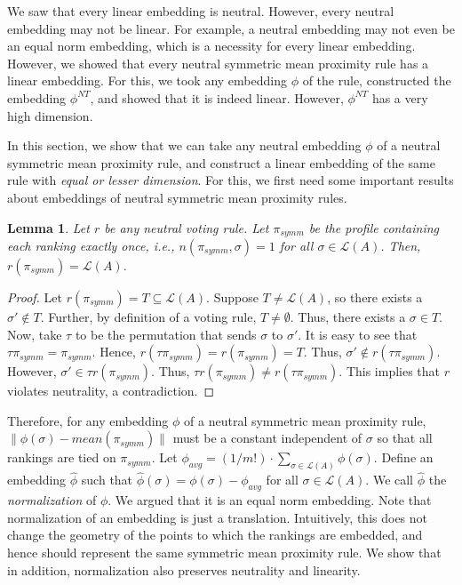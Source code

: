 \documentclass[10pt,letterpaper]{article}
\newcommand{\calL}{{\mathcal{L}}}
\newcommand{\rank}{{\calL(A)}}
\newtheorem{lemma}{Lemma}
\newcommand{\nt}{NT}
\begin{document}
We saw that every linear embedding is neutral. However, every neutral embedding may not be linear. For example, a neutral embedding may not even be an equal norm embedding, which is a necessity for every linear embedding. However, we showed that every neutral symmetric mean proximity rule has a linear embedding. For this, we took any embedding $\phi$ of the rule, constructed the embedding $\phi^{\nt}$, and showed that it is indeed linear. However, $\phi^{\nt}$ has a very high dimension. 

In this section, we show that we can take any neutral embedding $\phi$ of a neutral symmetric mean proximity rule, and construct a linear embedding of the same rule with \emph{equal or lesser dimension}. For this, we first need some important results about embeddings of neutral symmetric mean proximity rules.

\begin{lemma}
Let $r$ be any neutral voting rule. Let $\pi_{symm}$ be the profile containing each ranking exactly once, i.e., $n(\pi_{symm},\sigma) = 1$ for all $\sigma \in \rank$. Then, $r(\pi_{symm}) = \rank$. 
\label{lem:average-profile}
\end{lemma}
\begin{proof}
Let $r(\pi_{symm}) = T \subseteq \rank$. Suppose $T \neq \rank$, so there exists a $\sigma' \notin T$. Further, by definition of a voting rule, $T \neq \emptyset$. Thus, there exists a $\sigma \in T$. Now, take $\tau$ to be the permutation that sends $\sigma$ to $\sigma'$. %
It is easy to see that $\tau \pi_{symm} = \pi_{symm}$. Hence, $r(\tau \pi_{symm}) = r(\pi_{symm}) = T$. Thus, $\sigma' \notin r(\tau \pi_{symm})$. However, $\sigma' \in \tau r(\pi_{symm})$. Thus, $\tau r(\pi_{symm}) \neq r(\tau \pi_{symm})$. This implies that $r$ violates neutrality, a contradiction. 
\end{proof}

Therefore, for any embedding $\phi$ of a neutral symmetric mean proximity rule, $\|\phi(\sigma)-mean(\pi_{symm})\|$ must be a constant independent of $\sigma$ so that all rankings are tied on $\pi_{symm}$. Let $\phi_{avg} = (1/{m!}) \cdot \sum_{\sigma \in \rank} \phi(\sigma)$. Define an embedding $\hat{\phi}$  such that $\hat{\phi}(\sigma) = \phi(\sigma) - \phi_{avg}$ for all $\sigma \in \rank$. We call $\hat{\phi}$ the \emph{normalization} of $\phi$. We argued that it is an equal norm embedding. Note that normalization of an embedding is just a translation. Intuitively, this does not change the geometry of the points to which the rankings are embedded, and hence should represent the same symmetric mean proximity rule. We show that in addition, normalization also preserves neutrality and linearity. 
\end{document}
